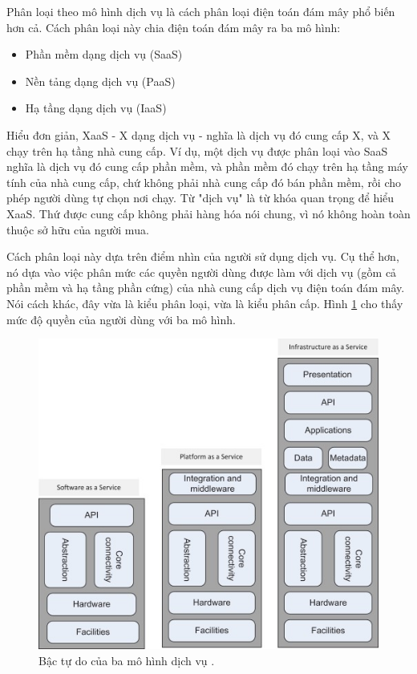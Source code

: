 \documentclass{article}
\begin{document}
Phân loại theo mô hình dịch vụ là cách phân loại điện toán đám mây phổ biến hơn
cả. Cách phân loại này chia điện toán đám mây ra ba mô hình:

\begin{itemize}
    \item Phần mềm dạng dịch vụ (SaaS)
    \item Nền tảng dạng dịch vụ (PaaS)
    \item Hạ tầng dạng dịch vụ (IaaS)
\end{itemize}

Hiểu đơn giản, XaaS - X dạng dịch vụ - nghĩa là dịch vụ đó cung cấp X, và X chạy
trên hạ tầng nhà cung cấp. Ví dụ, một dịch vụ được phân loại vào SaaS nghĩa là
dịch vụ đó cung cấp phần mềm, và phần mềm đó chạy trên hạ tầng máy tính của nhà
cung cấp, chứ không phải nhà cung cấp đó bán phần mềm, rồi cho phép người dùng
tự chọn nơi chạy. Từ "dịch vụ" là từ khóa quan trọng để hiểu XaaS. Thứ được cung
cấp không phải hàng hóa nói chung, vì nó không hoàn toàn thuộc sở hữu của người
mua.

Cách phân loại này dựa trên điểm nhìn của người sử dụng dịch vụ. Cụ thể hơn, nó
dựa vào việc phân mức các quyền người dùng được làm với dịch vụ (gồm cả phần mềm
và hạ tầng phần cứng) của nhà cung cấp dịch vụ điện toán đám mây. Nói cách khác,
đây vừa là kiểu phân loại, vừa là kiểu phân cấp. Hình \ref{csaguidev3} cho thấy
mức độ quyền của người dùng với ba mô hình.

\begin{figure}[H]
    \includegraphics[scale=0.8]{csaguidev3.jpg}
    \centering
    \caption{Bậc tự do của ba mô hình dịch vụ \cite{CSA2011}.}
    \label{csaguidev3}
\end{figure}
\end{document}
